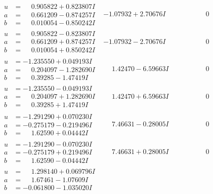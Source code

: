 \documentclass[1p]{elsarticle_modified}
\theoremstyle{definition}
\begin{document}
$$\begin{array}{c|c|c}
\begin{aligned}
u &= \phantom{-}0.905822 + 0.823807 I \\
a &= \phantom{-}0.661209 - 0.874257 I \\
b &= \phantom{-}0.010054 - 0.850242 I\end{aligned}
 & -1.07932 + 2.70676 I & \phantom{-0.000000 } 0 \\ \hline\begin{aligned}
u &= \phantom{-}0.905822 - 0.823807 I \\
a &= \phantom{-}0.661209 + 0.874257 I \\
b &= \phantom{-}0.010054 + 0.850242 I\end{aligned}
 & -1.07932 - 2.70676 I & \phantom{-0.000000 } 0 \\ \hline\begin{aligned}
u &= -1.235550 + 0.049193 I \\
a &= \phantom{-}0.204097 - 1.282690 I \\
b &= \phantom{-}0.39285 - 1.47419 I\end{aligned}
 & \phantom{-}1.42470 - 6.59663 I & \phantom{-0.000000 } 0 \\ \hline\begin{aligned}
u &= -1.235550 - 0.049193 I \\
a &= \phantom{-}0.204097 + 1.282690 I \\
b &= \phantom{-}0.39285 + 1.47419 I\end{aligned}
 & \phantom{-}1.42470 + 6.59663 I & \phantom{-0.000000 } 0 \\ \hline\begin{aligned}
u &= -1.291290 + 0.070230 I \\
a &= -0.275179 - 0.219496 I \\
b &= \phantom{-}1.62590 + 0.04442 I\end{aligned}
 & \phantom{-}7.46631 - 0.28005 I & \phantom{-0.000000 } 0 \\ \hline\begin{aligned}
u &= -1.291290 - 0.070230 I \\
a &= -0.275179 + 0.219496 I \\
b &= \phantom{-}1.62590 - 0.04442 I\end{aligned}
 & \phantom{-}7.46631 + 0.28005 I & \phantom{-0.000000 } 0 \\ \hline\begin{aligned}
u &= \phantom{-}1.298140 + 0.069796 I \\
a &= \phantom{-}1.67461 - 1.07609 I \\
b &= -0.061800 - 1.035020 I\end{aligned}

\end{array}$$
\end{document}
